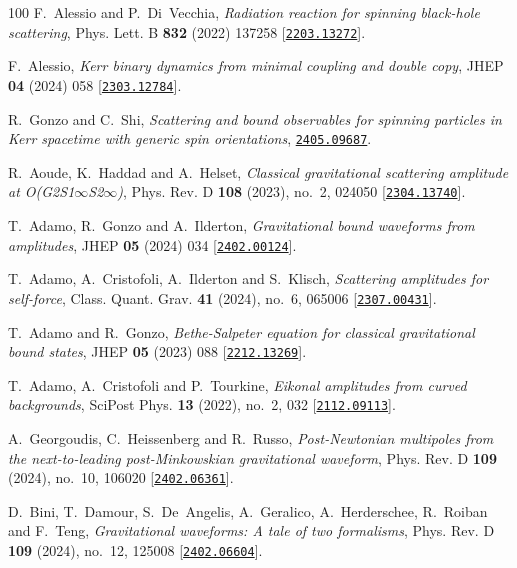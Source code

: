 \begin{thebibliography}{100}
F.~Alessio and P.~Di~Vecchia,  {\em {Radiation reaction for spinning black-hole
  scattering}}, Phys. Lett. B {\bf 832} (2022) 137258
  [\href{http://www.arXiv.org/abs/2203.13272}{{\tt 2203.13272}}].

F.~Alessio,  {\em {Kerr binary dynamics from minimal coupling and double
  copy}}, JHEP {\bf 04} (2024) 058
  [\href{http://www.arXiv.org/abs/2303.12784}{{\tt 2303.12784}}].

R.~Gonzo and C.~Shi,  {\em {Scattering and bound observables for spinning
  particles in Kerr spacetime with generic spin orientations}},
  \href{http://www.arXiv.org/abs/2405.09687}{{\tt 2405.09687}}.

R.~Aoude, K.~Haddad and A.~Helset,  {\em {Classical gravitational scattering
  amplitude at O(G2S1\ensuremath{\infty}S2\ensuremath{\infty})}}, Phys. Rev. D
  {\bf 108} (2023), no.~2, 024050
  [\href{http://www.arXiv.org/abs/2304.13740}{{\tt 2304.13740}}].

T.~Adamo, R.~Gonzo and A.~Ilderton,  {\em {Gravitational bound waveforms from
  amplitudes}}, JHEP {\bf 05} (2024) 034
  [\href{http://www.arXiv.org/abs/2402.00124}{{\tt 2402.00124}}].

T.~Adamo, A.~Cristofoli, A.~Ilderton and S.~Klisch,  {\em {Scattering
  amplitudes for self-force}}, Class. Quant. Grav. {\bf 41} (2024), no.~6,
  065006 [\href{http://www.arXiv.org/abs/2307.00431}{{\tt 2307.00431}}].

T.~Adamo and R.~Gonzo,  {\em {Bethe-Salpeter equation for classical
  gravitational bound states}}, JHEP {\bf 05} (2023) 088
  [\href{http://www.arXiv.org/abs/2212.13269}{{\tt 2212.13269}}].

T.~Adamo, A.~Cristofoli and P.~Tourkine,  {\em {Eikonal amplitudes from curved
  backgrounds}}, SciPost Phys. {\bf 13} (2022), no.~2, 032
  [\href{http://www.arXiv.org/abs/2112.09113}{{\tt 2112.09113}}].

A.~Georgoudis, C.~Heissenberg and R.~Russo,  {\em {Post-Newtonian multipoles
  from the next-to-leading post-Minkowskian gravitational waveform}}, Phys.
  Rev. D {\bf 109} (2024), no.~10, 106020
  [\href{http://www.arXiv.org/abs/2402.06361}{{\tt 2402.06361}}].

D.~Bini, T.~Damour, S.~De~Angelis, A.~Geralico, A.~Herderschee, R.~Roiban and
  F.~Teng,  {\em {Gravitational waveforms: A tale of two formalisms}}, Phys.
  Rev. D {\bf 109} (2024), no.~12, 125008
  [\href{http://www.arXiv.org/abs/2402.06604}{{\tt 2402.06604}}].


\end{thebibliography}
